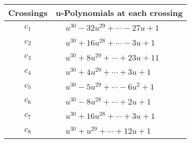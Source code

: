 \documentclass[1p]{elsarticle_modified}
\theoremstyle{definition}
\begin{document}
\begin{tabular}{m{50pt}|m{274pt}}
Crossings & \hspace{64pt}u-Polynomials at each crossing \\
\hline $$\begin{aligned}c_{1}\end{aligned}$$&$\begin{aligned}
&u^{30}-32 u^{29}+\cdots-27 u+1
\end{aligned}$\\
\hline $$\begin{aligned}c_{2}\end{aligned}$$&$\begin{aligned}
&u^{30}+16 u^{28}+\cdots-3 u+1
\end{aligned}$\\
\hline $$\begin{aligned}c_{3}\end{aligned}$$&$\begin{aligned}
&u^{30}+8 u^{29}+\cdots+23 u+11
\end{aligned}$\\
\hline $$\begin{aligned}c_{4}\end{aligned}$$&$\begin{aligned}
&u^{30}+4 u^{29}+\cdots+3 u+1
\end{aligned}$\\
\hline $$\begin{aligned}c_{5}\end{aligned}$$&$\begin{aligned}
&u^{30}-5 u^{29}+\cdots-6 u^2+1
\end{aligned}$\\
\hline $$\begin{aligned}c_{6}\end{aligned}$$&$\begin{aligned}
&u^{30}-8 u^{28}+\cdots+2 u+1
\end{aligned}$\\
\hline $$\begin{aligned}c_{7}\end{aligned}$$&$\begin{aligned}
&u^{30}+16 u^{28}+\cdots+3 u+1
\end{aligned}$\\
\hline $$\begin{aligned}c_{8}\end{aligned}$$&$\begin{aligned}
&u^{30}+u^{29}+\cdots+12 u+1
\end{aligned}$\\

\end{tabular}
\end{document}

